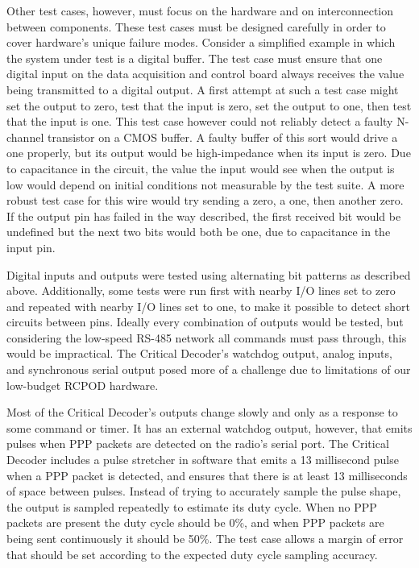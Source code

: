 \documentclass[letterpaper]{article}
\begin{document}
Other test cases, however, must focus on the hardware and on interconnection between components. These test
cases must be designed carefully in order to cover hardware's unique failure modes. Consider a simplified
example in which the system under test is a digital buffer. The test case must ensure that one
digital input on the data acquisition and control board always receives the value being transmitted to a
digital output. A first attempt at such a test case might set the output to zero, test that the input is
zero, set the output to one, then test that the input is one. This test case however
could not reliably detect a faulty N-channel transistor on a CMOS buffer. A faulty buffer of this sort would
drive a one properly, but its output would be high-impedance when
its input is zero. Due to capacitance in the circuit, the value the input would see when the output is low would
depend on initial conditions not measurable by the test suite. A more robust test case for this wire would try
sending a zero, a one, then another zero. If the output pin has failed in the way described, the first
received bit would be undefined but the next two bits would both be one, due to capacitance in the input pin.

Digital inputs and outputs were tested using alternating bit patterns as described above. Additionally, some
tests were run first with nearby I/O lines set to zero and repeated with nearby I/O lines set to one, to make it
possible to detect short circuits between pins. Ideally every combination of outputs would be tested, but considering
the low-speed RS-485 network all commands must pass through, this would be impractical.
The Critical Decoder's watchdog output, analog inputs, and synchronous
serial output posed more of a challenge due to limitations of our low-budget RCPOD hardware.

Most of the Critical Decoder's outputs change slowly and only as a response to some command or timer. It has
an external watchdog output, however, that emits pulses when PPP packets are detected on the radio's serial port.
The Critical Decoder includes a pulse stretcher in software that emits a 13 millisecond pulse when a PPP
packet is detected, and ensures that there is at least 13 milliseconds of space between pulses. Instead of trying
to accurately sample the pulse shape, the output is sampled repeatedly to estimate its duty cycle. When no PPP
packets are present the duty cycle should be 0\%, and when PPP packets are being sent continuously it should
be 50\%. The test case allows a margin of error that should be set according to the expected duty cycle sampling
accuracy.
\end{document}
